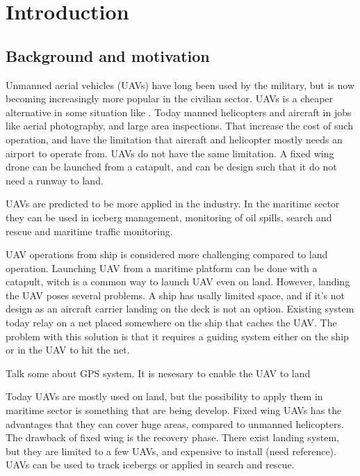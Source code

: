 
\chapter{Introduction}

\section{Background and motivation}

Unmanned aerial vehicles (UAVs) have long been used by the military, but is now becoming increasingly more popular in the civilian sector. UAVs is a cheaper alternative in some situation like . Today manned helicopters and aircraft in jobs like aerial photography, and large area inspections. That increase the cost of such operation, and have the limitation that aircraft and helicopter mostly needs an airport to operate from. UAVs do not have the same limitation. A fixed wing drone can be launched from a catapult, and can be design such that it do not need a runway to land.

UAVs are predicted to be more applied in the industry. In the maritime sector they can be used in iceberg management, monitoring of oil spills, search and rescue and maritime traffic monitoring.

UAV operations from ship is considered more challenging compared to land operation. Launching UAV from a maritime platform can be done with a catapult, witch is a common way to launch UAV even on land. However, landing the UAV poses several problems. A ship has usally limited space, and if it's not design as an aircraft carrier landing on the deck is not an option. Existing system today relay on a net placed somewhere on the ship that caches the UAV. The problem with this solution is that it requires a guiding  system either on the ship or in the UAV to hit the net.

Talk some about GPS system. It is nesesary to enable the UAV to land

Today UAVs are mostly used on land, but the possibility to apply them in maritime sector is something that are being develop. Fixed wing UAVs has the advantages that they can cover huge areas, compared to unmanned helicopters. The drawback of fixed wing is the recovery phase. There exist landing system, but they are limited to a few UAVs, and expensive to install (need reference). UAVs can be used to track icebergs or applied in search and rescue.

